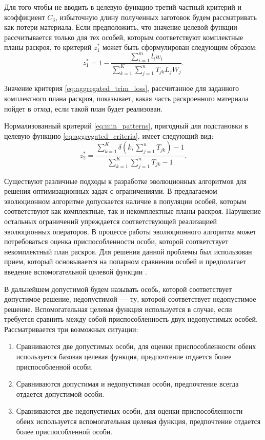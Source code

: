 \documentclass[12pt]{article}
\begin{document}
Для того чтобы не вводить в целевую функцию третий частный критерий и 
коэффициент $C_3$, избыточную длину полученных заготовок будем рассматривать
как потери материала. Если предположить, что значение целевой функции 
рассчитывается только для тех особей, которым соответствуют комплектные планы 
раскроя, то критерий $z_1^*$ может быть сформулирован следующим образом:
\begin{equation}\label{eq:aggregated_trim_loss}
    z_1^*=1-\frac{ \sum_{i=1}^{m} l_iw_i }{ \sum_{k=1}^{K} \sum_{j=1}^{n} T_{jk}L_jW_j }.
\end{equation}

Значение критерия 
\eqref{eq:aggregated_trim_loss}, 
рассчитанное для заданного комплектного плана раскроя, 
показывает, какая часть раскроенного материала пойдет в отход, если такой план 
будет реализован.

Нормализованный критерий 
\eqref{eq:min_patterns}, 
пригодный для подстановки в целевую функцию 
\eqref{eq:aggregated_criteria}, 
имеет следующий вид:
\begin{equation}\label{eq:min_patterns_normalized}
    z_2^*=\frac{ \sum_{k=1}^{K} \delta\left(k, \sum_{j=1}^{n} T_{jk}\right) - 1 }
    { \sum_{k=1}^{K} \sum_{j=1}^{n} T_{jk} - 1 }.
\end{equation}

Существуют различные подходы к разработке эволюционных алгоритмов для решения 
оптимизационных задач с ограничениями. В предлагаемом эволюционном алгоритме 
допускается наличие в популяции особей, которым соответствуют как комплектные, 
так и некомплектные планы раскроя. Нарушение остальных ограничений упреждается 
соответствующей реализацией эволюционных операторов. В процессе работы 
эволюционного алгоритма может потребоваться оценка приспособленности особи, 
которой соответствует некомплектный план раскроя. Для решения данной проблемы 
был использован прием, который основывается на попарном сравнении особей и 
предполагает введение вспомогательной целевой функции 
\cite{deb00}.

В дальнейшем допустимой будем называть особь, которой соответствует допустимое 
решение, недопустимой~--- ту, которой соответствует недопустимое решение. 
Вспомогательная целевая функция используется в случае, если требуется сравнить 
между собой приспособленность двух недопустимых особей. Рассматривается три 
возможных ситуации:
\begin{enumerate}
    \item Сравниваются две допустимых особи, для оценки приспособленности 
    обеих используется базовая целевая функция, предпочтение отдается более 
    приспособленной особи.
    \item Сравниваются допустимая и недопустимая особи, предпочтение всегда 
    отдается допустимой особи.
    \item Сравниваются две недопустимых особи, для оценки приспособленности 
    обеих используется вспомогательная целевая функция, предпочтение отдается 
    более приспособленной особи.
\end{enumerate}
\end{document}
